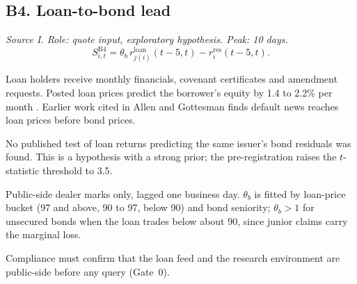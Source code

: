 \documentclass[11pt,letterpaper]{article}
\newcommand{\rres}{r^{\mathrm{res}}}      %
\begin{document}
\subsection{B4. Loan-to-bond lead}
\emph{Source I. Role: quote input, exploratory hypothesis. Peak: 10 days.}
\begin{equation}
S^{\mathrm{B4}}_{i,t}=\theta_{b}\,r^{\mathrm{loan}}_{j(i)}(t-5,t)-\rres_i(t-5,t).
\end{equation}
\begin{spec}
\item[Mechanism and evidence.] Loan holders receive monthly financials, covenant certificates and amendment requests. Posted loan prices predict the borrower's equity by 1.4 to 2.2\% per month \cite{am2020}. Earlier work cited in Allen and Gottesman \cite{ag} finds default news reaches loan prices before bond prices.
\item[Status.] No published test of loan returns predicting the same issuer's bond residuals was found. This is a hypothesis with a strong prior; the pre-registration raises the $t$-statistic threshold to 3.5.
\item[Build.] Public-side dealer marks only, lagged one business day. $\theta_b$ is fitted by loan-price bucket (97 and above, 90 to 97, below 90) and bond seniority; $\theta_b>1$ for unsecured bonds when the loan trades below about 90, since junior claims carry the marginal loss.
\item[Control.] Compliance must confirm that the loan feed and the research environment are public-side before any query (Gate~0).
\end{spec}
\end{document}
